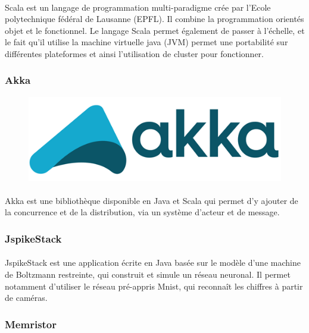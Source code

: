 \documentclass[a4paper,10pt]{article}
\begin{document}
\paragraph{}
Scala est un langage de programmation multi-paradigme crée par l’Ecole polytechnique fédéral de Lausanne (EPFL). Il combine la programmation orientés objet et le fonctionnel. Le langage Scala permet également de passer à l’échelle, et le fait qu’il utilise la machine virtuelle java (JVM) permet une portabilité sur différentes plateformes et ainsi l’utilisation de cluster pour fonctionner.

\subsubsection{Akka} 
\begin{figure}[h!]
\includegraphics[scale=0.1,right]{image/akka.png}
\end{figure}
\paragraph{}
Akka est une bibliothèque disponible en Java et Scala qui permet d’y ajouter de la concurrence et de la distribution, via un système d'acteur et de message.
        
\subsubsection{JspikeStack} 

\paragraph{}
JspikeStack est une application écrite en Java basée sur le modèle d'une machine de Boltzmann restreinte, qui construit et simule un réseau neuronal. Il permet notamment d’utiliser le réseau pré-appris Mnist, qui reconnaît les chiffres à partir de caméras.

\subsubsection{Memristor} 
\end{document}
